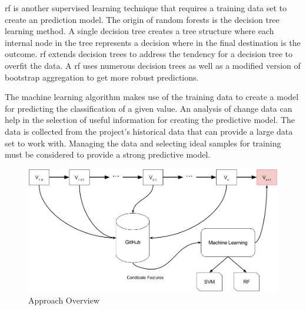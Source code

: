 \gls{rf} is another supervised learning technique that requires a training data set to create an prediction model. The origin of random forests is the decision tree learning method. A single decision tree creates a tree structure where each internal node in the tree represents a decision where in the final destination is the outcome. \gls{rf} extends decision trees to address the tendency for a decision tree to overfit the data. A \gls{rf} uses numerous decision trees as well as a modified version of bootstrap aggregation to get more robust predictions.



The machine learning algorithm makes use of the training data to create a model for predicting the classification of a given value. An analysis of change data can help in the selection of useful information for creating the predictive model. The data is collected from the project's historical data that can provide a large data set to work with. Managing the data and selecting ideal samples for training must be considered to provide a strong predictive model.

\begin{figure}[!ht]
    \centering
        \includegraphics[width=1.0\textwidth]{images/overview}
    \caption{Approach Overview}
    \label{fig:overview}
\end{figure}

